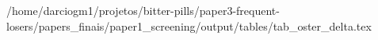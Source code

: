 /home/darciogm1/projetos/bitter-pills/paper3-frequent-losers/papers_finais/paper1_screening/output/tables/tab_oster_delta.tex